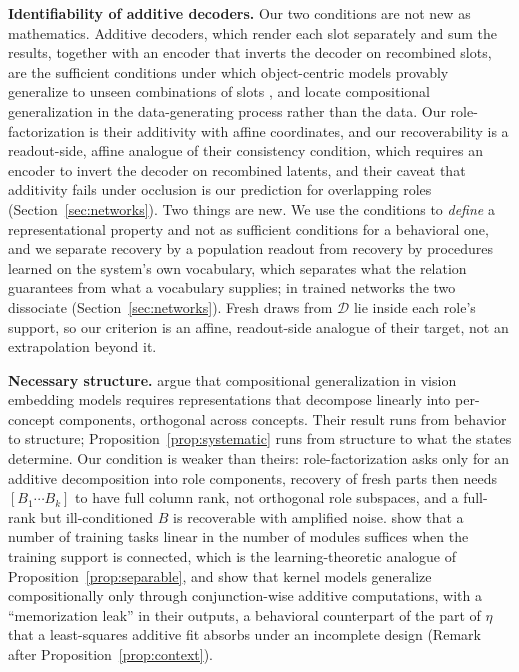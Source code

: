 \documentclass[10pt]{article}
\theoremstyle{plain}
\theoremstyle{remark}
\newcommand{\D}{\mathcal{D}}
\begin{document}
\textbf{Identifiability of additive decoders.} Our two conditions are not new as mathematics. Additive decoders, which render each slot separately and sum the results, together with an encoder that inverts the decoder on recombined slots, are the sufficient conditions under which object-centric models provably generalize to unseen combinations of slots \citep{brady2023,lachapelle2023,wiedemer2024}, and \citet{wiedemer2023} locate compositional generalization in the data-generating process rather than the data. Our role-factorization is their additivity with affine coordinates, and our recoverability is a readout-side, affine analogue of their consistency condition, which requires an encoder to invert the decoder on recombined latents, and their caveat that additivity fails under occlusion is our prediction for overlapping roles (Section~\ref{sec:networks}). Two things are new. We use the conditions to \emph{define} a representational property and not as sufficient conditions for a behavioral one, and we separate recovery by a population readout from recovery by procedures learned on the system's own vocabulary, which separates what the relation guarantees from what a vocabulary supplies; in trained networks the two dissociate (Section~\ref{sec:networks}). Fresh draws from $\D$ lie inside each role's support, so our criterion is an affine, readout-side analogue of their target, not an extrapolation beyond it.

\textbf{Necessary structure.} \citet{uselis2026} argue that compositional generalization in vision embedding models requires representations that decompose linearly into per-concept components, orthogonal across concepts. Their result runs from behavior to structure; Proposition~\ref{prop:systematic} runs from structure to what the states determine. Our condition is weaker than theirs: role-factorization asks only for an additive decomposition into role components, recovery of fresh parts then needs $[B_1 \cdots B_k]$ to have full column rank, not orthogonal role subspaces, and a full-rank but ill-conditioned $B$ is recoverable with amplified noise. \citet{schug2024} show that a number of training tasks linear in the number of modules suffices when the training support is connected, which is the learning-theoretic analogue of Proposition~\ref{prop:separable}, and \citet{lippl2025} show that kernel models generalize compositionally only through conjunction-wise additive computations, with a ``memorization leak'' in their outputs, a behavioral counterpart of the part of $\eta$ that a least-squares additive fit absorbs under an incomplete design (Remark after Proposition~\ref{prop:context}).
\end{document}
